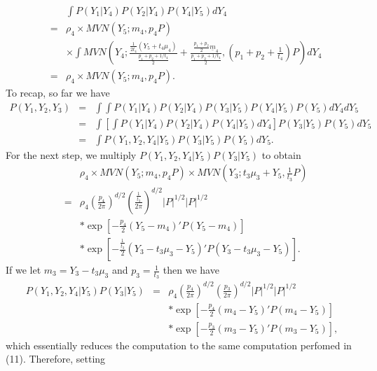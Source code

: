 \documentclass[12pt]{article}
\begin{document}
\begin{eqnarray}
& & \int  P(Y_1 | Y_4) P(Y_2 | Y_4) P(Y_4 | Y_5) dY_4 \\
& = & \rho_4 \times MVN \left( Y_5 ; m_4, p_4 P  \right)  \\
& & \times \int MVN \left(Y_4 ; \frac{ \frac{1}{2t_4} (Y_5 + t_4 \mu_4) }{\frac{p_1+p_2 + 1/t_4}{2}} + 
\frac{  \frac{p_1 +p_2}{2} \underline{m}_4 }{\frac{p_1+p_2 + 1/t_4}{2}} , \left(p_1 + p_2 + \frac{1}{t_4} \right)P \right) dY_4 \\
& = & \rho_4 \times MVN \left( Y_5 ; m_4, p_4 P  \right) .
\end{eqnarray}
To recap, so far we have
\begin{eqnarray}
P(Y_1,Y_2,Y_3) & = & \int \int P(Y_1 | Y_4) P(Y_2 | Y_4)  P(Y_3 | Y_5) P(Y_4 | Y_5) P(Y_5) dY_4 dY_5 \\
& = & \int \left[ \int P(Y_1 | Y_4) P(Y_2 | Y_4)  P(Y_4 | Y_5) dY_4 \right] P(Y_3 | Y_5) P(Y_5) dY_5 \\
& = & \int P(Y_1,Y_2,Y_4 | Y_5) P(Y_3 | Y_5) P(Y_5) dY_5.
\end{eqnarray}
For the next step, we multiply $P(Y_1,Y_2,Y_4 | Y_5) P(Y_3 | Y_5)$ to obtain
\begin{eqnarray}
& & \rho_4 \times MVN ( Y_5 ; m_4, p_4 P ) \times MVN \left(Y_3; t_3 \mu_3 + Y_5, \frac{1}{t_3}P \right) \\
& = & \rho_4 \left( \frac{p_4}{2 \pi} \right) ^{d/2}  \left( \frac{ \frac{1}{t_3} }{2 \pi} \right) ^{d/2} |P|^{1/2} |P|^{1/2}  \\
& & * \exp \left[ -\frac{p_4}{2} \left( Y_5  - m_4  \right)' P \left( Y_5 - m_4  \right)  \right] \\
 & & * \exp \left[ -\frac{ \frac{1}{t_3} }{2} \left(Y_3 - t_3 \mu_3 - Y_5 \right)' P \left( Y_3 - t_3 \mu_3 - Y_5  \right)   \right] .
\end{eqnarray}
If we let $m_3 = Y_3 - t_3 \mu_3$ and $p_3 = \frac{1}{t_3}$ then we have 
\begin{eqnarray}
P(Y_1,Y_2,Y_4 | Y_5) P(Y_3 | Y_5) & = & \rho_4 \left( \frac{p_4}{2 \pi} \right) ^{d/2}  \left( \frac{ p_3 }{2 \pi} \right) ^{d/2} |P|^{1/2} |P|^{1/2}  \\
& & * \exp \left[ -\frac{p_4}{2} \left( m_4  - Y_5  \right)' P \left( m_4 - Y_5  \right)  \right] \\
 & & * \exp \left[ -\frac{ p_3 }{2} \left(m_3 - Y_5 \right)' P \left( m_3 - Y_5  \right)   \right] ,
\end{eqnarray}
which essentially reduces the computation to the same computation perfomed in (11).  Therefore, setting 
\end{document}
